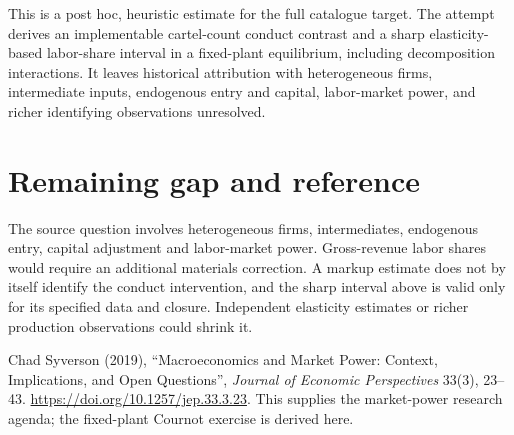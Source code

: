 \documentclass[11pt,a4paper]{article}
\theoremstyle{definition}
\theoremstyle{remark}
\begin{document}
This is a post hoc, heuristic estimate for the full catalogue target.
The attempt derives an implementable cartel-count conduct contrast and a sharp elasticity-based labor-share interval in a fixed-plant equilibrium, including decomposition interactions. It leaves historical attribution with heterogeneous firms, intermediate inputs, endogenous entry and capital, labor-market power, and richer identifying observations unresolved.

\section{Remaining gap and reference}
The source question involves heterogeneous firms, intermediates, endogenous entry, capital adjustment and labor-market power. Gross-revenue labor shares would require an additional materials correction. A markup estimate does not by itself identify the conduct intervention, and the sharp interval above is valid only for its specified data and closure. Independent elasticity estimates or richer production observations could shrink it.

Chad Syverson (2019), ``Macroeconomics and Market Power: Context, Implications, and Open Questions'', \emph{Journal of Economic Perspectives} 33(3), 23--43. \url{https://doi.org/10.1257/jep.33.3.23}. This supplies the market-power research agenda; the fixed-plant Cournot exercise is derived here.
\end{document}

